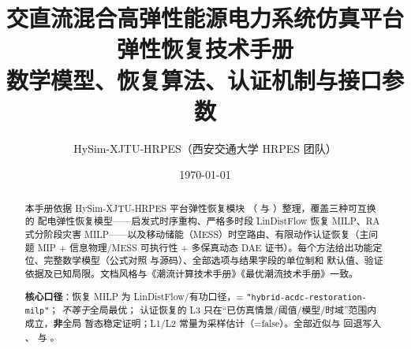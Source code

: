 \documentclass[UTF8,fontset=fandol,a4paper,11pt]{ctexart}
\title{\textbf{交直流混合高弹性能源电力系统仿真平台}\\[0.5em]
       {\Large 弹性恢复技术手册}\\[0.3em]
       {\large 数学模型、恢复算法、认证机制与接口参数}}
\author{HySim-XJTU-HRPES（西安交通大学 HRPES 团队）}
\date{\today}
\begin{document}
\maketitle
\begin{abstract}
\noindent 本手册依据 HySim-XJTU-HRPES 平台弹性恢复模块
（ 与 ）整理，覆盖三种可互换的
配电弹性恢复模型——启发式时序重构、严格多时段 LinDistFlow 恢复 MILP、RA 式分阶段灾害
MILP——以及移动储能（MESS）时空路由、有限动作认证恢复（主问题 MIP + 信息物理/MESS
可执行性 + 多保真动态 DAE 证书）。每个方法给出功能定位、完整数学模型（公式对照
 与源码）、全部选项与结果字段的单位制和
默认值、验证依据及已知局限。文档风格与《潮流计算技术手册》《最优潮流技术手册》一致。

\smallskip
\noindent\textbf{核心口径}：恢复 MILP 为 LinDistFlow/有功口径，=
\texttt{"hybrid-acdc-restoration-milp"}； \emph{不等于}全局最优；
认证恢复的 L3  只在“已仿真情景/阈值/模型/时域”范围内成立，\textbf{非}全局
暂态稳定证明；L1/L2 常量为采样估计（=false）。全部近似与
回退写入 、 与 。
\end{abstract}

\tableofcontents
\newpage











\end{document}
